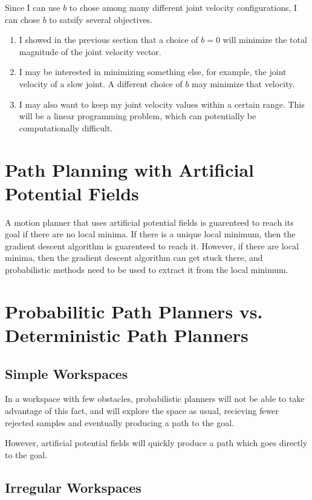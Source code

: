 \documentclass{article}
\begin{document}
Since I can use $b$ to chose among many different joint velocity configurations,
	I can chose $b$ to satsify several objectives.

\begin{enumerate}
\item
I showed in the previous section that a choice of $b = 0$ will minimize the total magnitude
	of the joint velocity vector.
\item
I may be interested in minimizing something else, for example, the joint velocity
	of a slow joint.
A different choice of $b$ may minimize that velocity.
\item
I may also want to keep my joint velocity values within a certain range.
This will be a linear programming problem, which can potentially be computationally
	difficult.
\end{enumerate}

\section{Path Planning with Artificial Potential Fields}

A motion planner that uses artificial potential fields is guarenteed to reach its
	goal if there are no local minima.
If there is a unique local minimum, then the gradient descent algorithm is guarenteed
	to reach it.
However, if there are local minima, then the gradient descent algorithm can get stuck there,
	and probabilistic methods need to be used to extract it from the local minimum.

\section{Probabilitic Path Planners vs. Deterministic Path Planners}

\subsection{Simple Workspaces}

In a workspace with few obstacles, probabilistic planners will not be able to take
	advantage of this fact, and will explore the space as usual, recieving fewer
	rejected samples and eventually producing a path to the goal.

However, artificial potential fields will quickly produce a path which goes directly
	to the goal.

\subsection{Irregular Workspaces}
\end{document}
